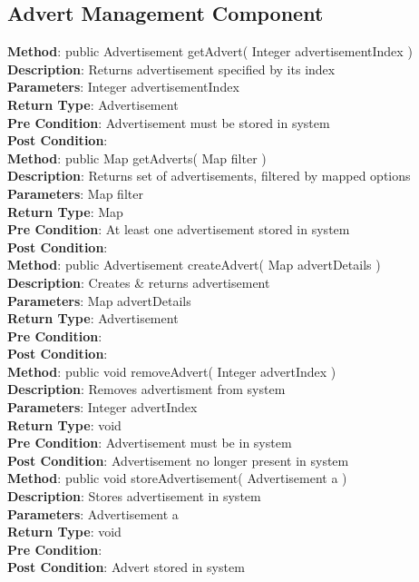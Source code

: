 \documentclass{l3deliverable}
\begin{document}
\subsection{Advert Management Component}
\textbf{Method}: public Advertisement getAdvert( Integer advertisementIndex )\\
\textbf{Description}: Returns advertisement specified by its index\\
\textbf{Parameters}: Integer advertisementIndex\\
\textbf{Return Type}: Advertisement\\
\textbf{Pre Condition}: Advertisement must be stored in system\\
\textbf{Post Condition}:\\

\textbf{Method}: public Map getAdverts( Map filter )\\
\textbf{Description}: Returns set of advertisements, filtered by mapped options\\
\textbf{Parameters}: Map filter\\
\textbf{Return Type}: Map\\
\textbf{Pre Condition}: At least one advertisement stored in system\\
\textbf{Post Condition}:\\

\textbf{Method}: public Advertisement createAdvert( Map advertDetails )\\
\textbf{Description}: Creates \& returns advertisement\\
\textbf{Parameters}: Map advertDetails\\
\textbf{Return Type}: Advertisement \\
\textbf{Pre Condition}:\\
\textbf{Post Condition}:\\

\textbf{Method}: public void removeAdvert( Integer advertIndex )\\
\textbf{Description}: Removes advertisment from system\\
\textbf{Parameters}: Integer advertIndex \\
\textbf{Return Type}: void \\
\textbf{Pre Condition}: Advertisement must be in system \\
\textbf{Post Condition}: Advertisement no longer present in system\\

\textbf{Method}: public void storeAdvertisement( Advertisement a )\\
\textbf{Description}: Stores advertisement in system\\
\textbf{Parameters}: Advertisement a\\
\textbf{Return Type}: void\\
\textbf{Pre Condition}:\\
\textbf{Post Condition}: Advert stored in system\\
\end{document}
